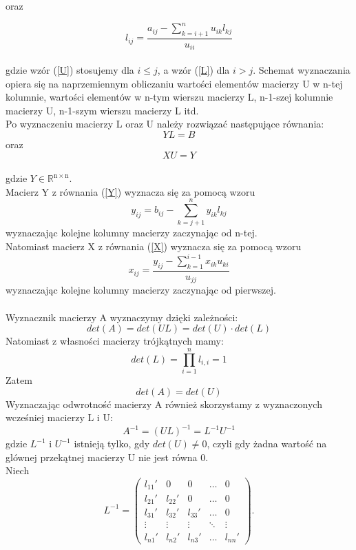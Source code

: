 \documentclass[12pt]{article}
\begin{document}
oraz
 
\begin{equation}
l_{ij}=\dfrac{a_{ij}-\sum_{k=i+1}^n u_{ik}l_{kj}}{u_{ii}} \label{L}
\end{equation}
\\
gdzie wz\'or (\ref{U}) stosujemy dla $i \leq j$, a wz\'or (\ref{L}) dla $i > j$.
Schemat wyznaczania opiera si\k{e} na naprzemiennym obliczaniu warto\'sci element\'ow macierzy U w n-tej kolumnie, warto\'sci element\'ow w n-tym wierszu macierzy L, n-1-szej kolumnie macierzy U, n-1-szym wierszu macierzy L itd.
\\
Po wyznaczeniu macierzy L oraz U nale\.zy rozwi\k{a}za\'c nast\k{e}puj\k{a}ce r\'ownania:
\begin{equation}
YL=B \label{Y}
\end{equation}
oraz
\begin{equation}
XU=Y \label{X}
\end{equation}
\\
gdzie $Y\in \mathbb R^\mathrm{n\times n}$. 
\\
Macierz Y z r\'ownania (\ref{Y}) wyznacza si\k{e} za pomoc\k{a} wzoru
\[
y_{ij}=b_{ij}-\sum_{k=j+1}^n y_{ik}l_{kj} 
\]
wyznaczaj\k{a}c kolejne kolumny macierzy zaczynaj\k{a}c od n-tej. 
\\
 Natomiast macierz X z r\'ownania (\ref{X}) wyznacza si\k{e} za pomoc\k{a} wzoru
 \[
 x_{ij}=\frac{y_{ij}-\sum_{k=1}^{i-1} x_{ik}u_{ki}}{u_{jj}}
 \]
 wyznaczaj\k{a}c kolejne kolumny macierzy zaczynaj\k{a}c od pierwszej. 
\\
\\
Wyznacznik macierzy A wyznaczymy dzi\k{e}ki zale\.zno\'sci:
\[
det(A)=det(UL)=det(U)\cdot det(L)
\]
Natomiast z w\l{}asno\'sci macierzy tr\'ojk\k{a}tnych mamy:
\[
det(L)=\prod_{i=1}^n l_{i,i}=1
\]
Zatem 
\[
det(A)=det(U)
\]
Wyznaczaj\k{a}c odwrotno\'s\'c macierzy A r\'ownie\.z skorzystamy z wyznaczonych wcze\'sniej macierzy L i U:
\[
A^{-1}=(UL)^{-1}=L^{-1}U^{-1}
\]
gdzie $L^{-1}$ i $U^{-1}$ istniej\k{a} tylko, gdy $det(U)\neq 0$, czyli gdy \.zadna warto\'s\'c na gl\'ownej przek\k{a}tnej macierzy U nie jest r\'owna 0.
\\
Niech 
\[
L^{-1}=\begin{pmatrix}
l_{11}' & 0 & 0 & \ldots & 0 \\
l_{21}' & l_{22}' & 0 & \ldots & 0 \\
l_{31}' & l_{32}' & l_{33}' & \ldots & 0 \\
\vdots & \vdots & \vdots & \ddots & \vdots \\
l_{n1}' & l_{n2}' & l_{n3}' & \ldots & l_{nn}'
\end{pmatrix}.
\]
\end{document}
